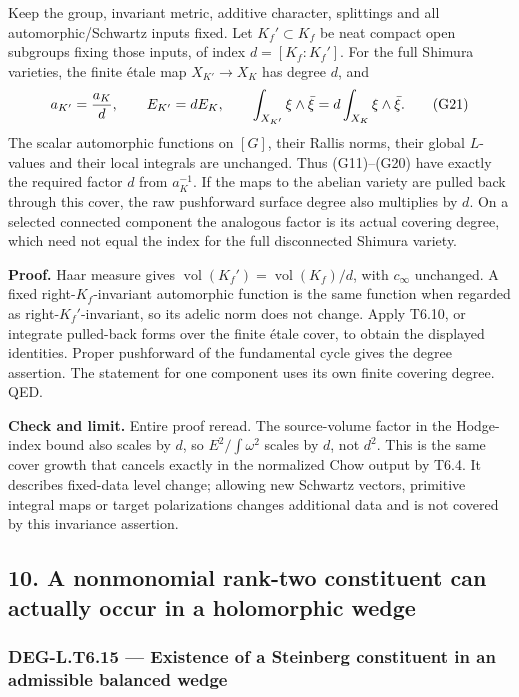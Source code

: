 \documentclass[11pt,a4paper]{article}
\theoremstyle{definition}
\begin{document}
Keep the group, invariant metric, additive character, splittings and all automorphic/Schwartz inputs fixed. Let \(K_f'\subset K_f\) be neat compact open subgroups fixing those inputs, of index \(d=[K_f:K_f']\). For the full Shimura varieties, the finite étale map \(X_{K'}\to X_K\) has degree \(d\), and \[
a_{K'}={a_K\over d},\qquad
E_{K'}=dE_K,\qquad
\int_{X_{K'}}\xi\wedge\bar\xi
=d\int_{X_K}\xi\wedge\bar\xi.
\tag{G21}
\] The scalar automorphic functions on \([G]\), their Rallis norms, their global \(L\)-values and their local integrals are unchanged. Thus (G11)--(G20) have exactly the required factor \(d\) from \(a_K^{-1}\). If the maps to the abelian variety are pulled back through this cover, the raw pushforward surface degree also multiplies by \(d\). On a selected connected component the analogous factor is its actual covering degree, which need not equal the index for the full disconnected Shimura variety.

\textbf{Proof.} Haar measure gives \(\operatorname{vol}(K_f')=\operatorname{vol}(K_f)/d\), with \(c_\infty\) unchanged. A fixed right-\(K_f\)-invariant automorphic function is the same function when regarded as right-\(K_f'\)-invariant, so its adelic norm does not change. Apply T6.10, or integrate pulled-back forms over the finite étale cover, to obtain the displayed identities. Proper pushforward of the fundamental cycle gives the degree assertion. The statement for one component uses its own finite covering degree. QED.

\textbf{Check and limit.} Entire proof reread. The source-volume factor in the Hodge-index bound also scales by \(d\), so \(E^2/\int\omega^2\) scales by \(d\), not \(d^2\). This is the same cover growth that cancels exactly in the normalized Chow output by T6.4. It describes fixed-data level change; allowing new Schwartz vectors, primitive integral maps or target polarizations changes additional data and is not covered by this invariance assertion.

\subsection{10. A nonmonomial rank-two constituent can actually occur in a holomorphic wedge}\label{a-nonmonomial-rank-two-constituent-can-actually-occur-in-a-holomorphic-wedge}

\subsubsection{DEG-L.T6.15 --- Existence of a Steinberg constituent in an admissible balanced wedge}\label{DEG-L.T6.15}
\end{document}
